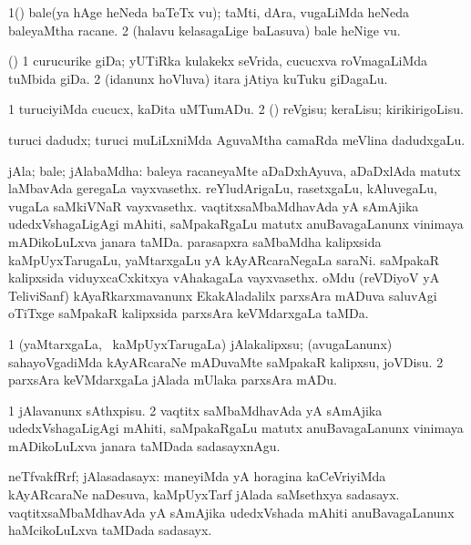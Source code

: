 \bentry
{}
\gl{\nA}
\bmng
\bnum
\num{1}(\kanmu) bale(ya hAge heNeda baTeTx \mo vu); taMti, dAra, \mo vugaLiMda heNeda baleyaMtha racane. 
\num{2} (halavu kelasagaLige baLasuva) bale heNige \mo vu. 
\enum
\emng
\eentry

\bentry
{}
\gl{\nA}
\bmng
(\savi) 
\bnum
\num{1} curucurike giDa; yUTiRka kulakekx seVrida, cucucxva roVmagaLiMda tuMbida giDa. 
\num{2} (idanunx hoVluva) itara jAtiya kuTuku giDagaLu. 
\enum
\emng
\eentry

\bentry
{}
\gl{\sakirx}
\bmng
\bnum
\num{1} turuciyiMda cucucx, kaDita uMTumADu. 
\num{2} (\rUpa) reVgisu; keraLisu; kirikirigoLisu. 
\enum
\emng
\eentry


\bentry
{}
\gl{\nA}
\bmng
turuci dadudx; turuci muLiLxniMda AguvaMtha camaRda meVlina dadudxgaLu. 
\emng
\eentry

\bentry
{}
\gl{\nA}
\bmng
jAla; bale; jAlabaMdha: 
\banum
{} baleya racaneyaMte aDaDxhAyuva, aDaDxlAda matutx laMbavAda geregaLa vayxvasethx. 
 reYludArigaLu, rasetxgaLu, kAluvegaLu, \mo vugaLa saMkiVNaR vayxvasethx. 
 vaqtitxsaMbaMdhavAda yA sAmAjika udedxVshagaLigAgi mAhiti, saMpakaRgaLu matutx anuBavagaLanunx vinimaya mADikoLuLxva janara taMDa. 
 parasapxra saMbaMdha kalipxsida kaMpUyxTarugaLu, yaMtarxgaLu yA kAyARcaraNegaLa saraNi. 
 saMpakaR kalipxsida viduyxcaCxkitxya vAhakagaLa vayxvasethx. 
 oMdu (reVDiyoV yA TeliviSanf) kAyaRkarxmavanunx EkakAladalilx parxsAra mADuva saluvAgi oTiTxge saMpakaR kalipxsida parxsAra keVMdarxgaLa taMDa. 
\eanum
\emng
\eentry

\bentry
{}
\gl{\sakirx}
\bmng
\bnum
\num{1} (yaMtarxgaLa, \kanmu\ kaMpUyxTarugaLa) jAlakalipxsu; (avugaLanunx) sahayoVgadiMda kAyARcaraNe mADuvaMte saMpakaR kalipxsu, joVDisu. 
\num{2} parxsAra keVMdarxgaLa jAlada mUlaka parxsAra mADu. 
\enum
\emng

\noindent
\gl{\akirx}
\bmng
\bnum
\num{1} jAlavanunx sAthxpisu. 
\num{2} vaqtitx saMbaMdhavAda yA sAmAjika udedxVshagaLigAgi mAhiti, saMpakaRgaLu matutx anuBavagaLanunx vinimaya mADikoLuLxva janara taMDada sadasayxnAgu. 
\enum
\emng
\eentry

\bentry
{}
\gl{\nA}
\bmng
neTfvakfRrf; jAlasadasayx: 
\banum
{} maneyiMda yA horagina kaCeVriyiMda kAyARcaraNe naDesuva, kaMpUyxTarf jAlada saMsethxya sadasayx. 
 vaqtitxsaMbaMdhavAda yA sAmAjika udedxVshada mAhiti anuBavagaLanunx haMcikoLuLxva taMDada sadasayx. 
\eanum
\emng
\eentry

